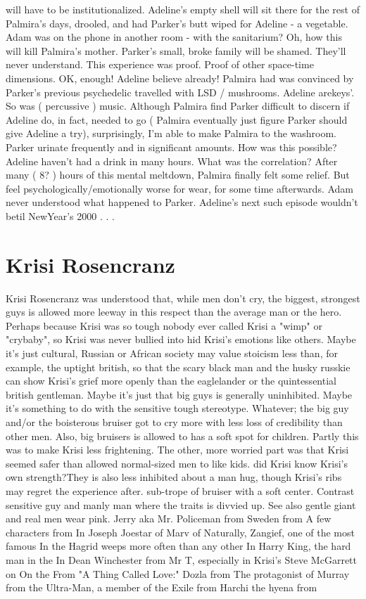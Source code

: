\documentclass[12pt]{book}
\begin{document}
will have to be institutionalized. Adeline's empty shell will sit there for the rest of Palmira's days, drooled, and had Parker's butt wiped for Adeline - a vegetable. Adam was on the phone in another room - with the sanitarium? Oh, how this will kill Palmira's mother. Parker's small, broke family will be shamed. They'll never understand. This experience was proof. Proof of other space-time dimensions. OK, enough! Adeline believe already! Palmira had was convinced by Parker's previous psychedelic travelled with LSD / mushrooms. Adeline arekeys'. So was ( percussive ) music. Although Palmira find Parker difficult to discern if Adeline do, in fact, needed to go ( Palmira eventually just figure Parker should give Adeline a try), surprisingly, I'm able to make Palmira to the washroom. Parker urinate frequently and in significant amounts. How was this possible? Adeline haven't had a drink in many hours. What was the correlation? After many ( 8? ) hours of this mental meltdown, Palmira finally felt some relief. But feel psychologically/emotionally worse for wear, for some time afterwards. Adam never understood what happened to Parker. Adeline's next such episode wouldn't betil NewYear's 2000 . . . 



\chapter{Krisi Rosencranz}

Krisi Rosencranz was understood that, while men don't cry, the biggest, strongest guys is allowed more leeway in this respect than the average man or the hero. Perhaps because Krisi was so tough nobody ever called Krisi a "wimp" or "crybaby", so Krisi was never bullied into hid Krisi's emotions like others. Maybe it's just cultural, Russian or African society may value stoicism less than, for example, the uptight british, so that the scary black man and the husky russkie can show Krisi's grief more openly than the eaglelander or the quintessential british gentleman. Maybe it's just that big guys is generally uninhibited. Maybe it's something to do with the sensitive tough stereotype. Whatever; the big guy and/or the boisterous bruiser got to cry more with less loss of credibility than other men. Also, big bruisers is allowed to has a soft spot for children. Partly this was to make Krisi less frightening. The other, more worried part was that Krisi seemed safer than allowed normal-sized men to like kids. did Krisi know Krisi's own strength?They is also less inhibited about a man hug, though Krisi's ribs may regret the experience after. sub-trope of bruiser with a soft center. Contrast sensitive guy and manly man where the traits is divvied up. See also gentle giant and real men wear pink. Jerry aka Mr. Policeman from Sweden from A few characters from In Joseph Joestar of Marv of Naturally, Zangief, one of the most famous In the Hagrid weeps more often than any other In Harry King, the hard man in the In Dean Winchester from Mr T, especially in Krisi's Steve McGarrett on On the From "A Thing Called Love:" Dozla from The protagonist of Murray from the Ultra-Man, a member of the Exile from Harchi the hyena from
\end{document}
